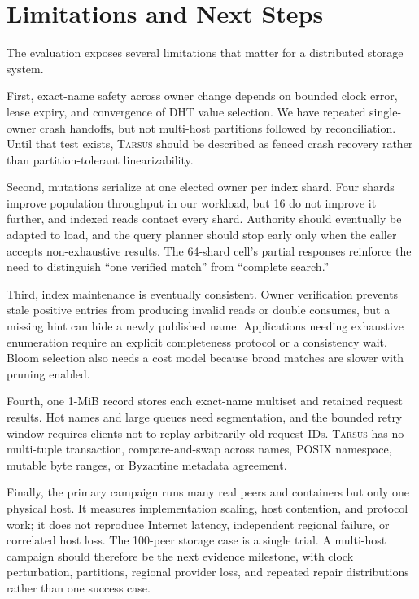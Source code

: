 \documentclass[conference]{IEEEtran}
\newcommand{\system}{\textsc{Tarsus}\xspace}
\begin{document}
\section{Limitations and Next Steps}
\label{sec:limitations}

The evaluation exposes several limitations that matter for a distributed
storage system.

First, exact-name safety across owner change depends on bounded clock error,
lease expiry, and convergence of DHT value selection. We have repeated
single-owner crash handoffs, but not multi-host partitions followed by
reconciliation. Until that test exists, \system should be described as fenced
crash recovery rather than partition-tolerant linearizability.

Second, mutations serialize at one elected owner per index shard. Four shards
improve population throughput in our workload, but 16 do not improve it
further, and indexed reads contact every shard. Authority should eventually be
adapted to load, and the query planner should stop early only when the caller
accepts non-exhaustive results. The 64-shard cell's partial responses reinforce
the need to distinguish ``one verified match'' from ``complete search.''

Third, index maintenance is eventually consistent. Owner verification prevents
stale positive entries from producing invalid reads or double consumes, but a
missing hint can hide a newly published name. Applications needing exhaustive
enumeration require an explicit completeness protocol or a consistency wait.
Bloom selection also needs a cost model because broad matches are slower with
pruning enabled.

Fourth, one 1-MiB record stores each exact-name multiset and retained request
results. Hot names and large queues need segmentation, and the bounded retry
window requires clients not to replay arbitrarily old request IDs. \system has
no multi-tuple transaction, compare-and-swap across names, POSIX namespace,
mutable byte ranges, or Byzantine metadata agreement.

Finally, the primary campaign runs many real peers and containers but only one
physical host. It measures implementation scaling, host contention, and
protocol work; it does not reproduce Internet latency, independent regional
failure, or correlated host loss. The 100-peer storage case is a single trial.
A multi-host campaign should therefore be the next evidence milestone, with
clock perturbation, partitions, regional provider loss, and repeated repair
distributions rather than one success case.
\end{document}
